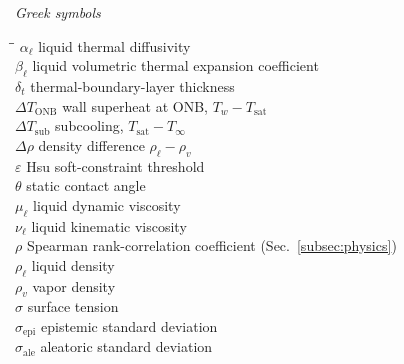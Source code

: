 \noindent\textit{Greek symbols}
\begin{tabbing}
\hspace{2.4cm}\=\hspace{10cm}\=\kill
$\alpha_{\ell}$    \> liquid thermal diffusivity                          \> [\si{m^2/s}] \\
$\beta_{\ell}$     \> liquid volumetric thermal expansion coefficient     \> [\si{1/K}] \\
$\delta_t$         \> thermal-boundary-layer thickness                    \> [m] \\
$\Delta T_{\mathrm{ONB}}$ \> wall superheat at ONB, $T_w-T_{\mathrm{sat}}$ \> [K] \\
$\Delta T_{\mathrm{sub}}$ \> subcooling, $T_{\mathrm{sat}}-T_{\infty}$    \> [K] \\
$\Delta\rho$       \> density difference $\rho_{\ell}-\rho_v$             \> [\si{kg/m^3}] \\
$\varepsilon$      \> Hsu soft-constraint threshold                       \> [---] \\
$\theta$           \> static contact angle                                \> [\si{\degree}] \\
$\mu_{\ell}$       \> liquid dynamic viscosity                            \> [\si{Pa.s}] \\
$\nu_{\ell}$       \> liquid kinematic viscosity                          \> [\si{m^2/s}] \\
$\rho$             \> Spearman rank-correlation coefficient (Sec.~\ref{subsec:physics}) \> [---] \\
$\rho_{\ell}$      \> liquid density                                      \> [\si{kg/m^3}] \\
$\rho_v$           \> vapor density                                       \> [\si{kg/m^3}] \\
$\sigma$           \> surface tension                                     \> [\si{N/m}] \\
$\sigma_{\mathrm{epi}}$  \> epistemic standard deviation                  \> [K] \\
$\sigma_{\mathrm{ale}}$  \> aleatoric standard deviation                  \> [K] \\
\end{tabbing}

